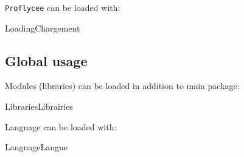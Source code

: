 \documentclass[a4paper,english,11pt]{article}
\begin{document}
\texttt{Proflycee} can be loaded with:

\begin{myprestexcode}{Loading}{Chargement}
\usepackage[options]{ProfLycee}
\usepackage[options]{ProfLycee-Light}

\end{myprestexcode}

\subsection{Global usage}

Modules (libraries) can be loaded in addition to main package:

\begin{myprestexcode}{Libraries}{Librairies}


\end{myprestexcode}

Language can be loaded with:

\begin{myprestexcode}{Language}{Langue}

\end{myprestexcode}
\end{document}
